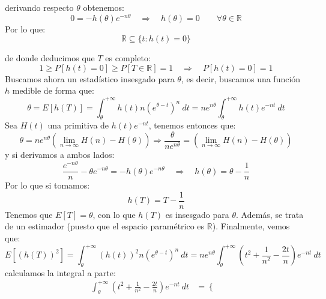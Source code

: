 \begin{ejercicio}
    derivando respecto $\theta$ obtenemos:
    \begin{equation*}
        0 = -h(\theta)e^{-n\theta} \quad \Longrightarrow \quad  h(\theta) = 0 \qquad \forall \theta\in \mathbb{R}
    \end{equation*}
    Por lo que:
    \begin{equation*}
        \mathbb{R}\subseteq \{t:h(t) = 0\}
    \end{equation*}

    de donde deducimos que $T$ es completo:
    \begin{equation*}
        1 \geq P[h(t) = 0] \geq P[T\in \mathbb{R}] = 1 \quad \Longrightarrow \quad P[h(t)=0] = 1
    \end{equation*}
    Buscamos ahora un estadístico insesgado para $\theta$, es decir, buscamos una función $h$ medible de forma que:
    \begin{equation*}
        \theta = E[h(T)] = \int_{\theta}^{+\infty} h(t) n{(e^{\theta-t})}^{n}~dt  = ne^{n\theta}\int_{\theta}^{+\infty} h(t)e^{-nt}~dt 
    \end{equation*}
    Sea $H(t)$ una primitiva de $h(t)e^{-nt}$, tenemos entonces que:
    \begin{equation*}
        \theta = ne^{n\theta}\left(\lim_{n\to\infty}H(n)-H(\theta )\right) \Longrightarrow \frac{\theta}{ne^{n\theta}} = \left(\lim_{n\to\infty}H(n)-H(\theta )\right)
    \end{equation*}
    y si derivamos a ambos lados:
    \begin{equation*}
        \dfrac{e^{-n\theta}}{n} - \theta e^{-n\theta} = -h(\theta)e^{-n\theta} \quad \Longrightarrow \quad  h(\theta) = \theta-\frac{1}{n}
    \end{equation*}
    Por lo que si tomamos:
    \begin{equation*}
        h(T) = T - \dfrac{1}{n}
    \end{equation*}
    Tenemos que $E[T] = \theta$, con lo que $h(T)$ es insesgado para $\theta$. Además, se trata de un estimador (puesto que el espacio paramétrico es $\mathbb{R}$). Finalmente, vemos que:
    \begin{equation*}
        E[{(h(T))}^{2}] = \int_{\theta}^{+\infty} {(h(t))}^{2}n{\left(e^{\theta-t}\right)}^{n}~dt  = ne^{n\theta} \int_{\theta}^{+\infty} \left(t^2 + \frac{1}{n^2}-\frac{2t}{n}\right)e^{-nt}~dt  
    \end{equation*}
    calculamos la integral a parte:
    \begin{align*}
        \int_{\theta}^{+\infty} \left(t^2 + \frac{1}{n^2}-\frac{2t}{n}\right)e^{-nt}~dt &= \left\{\begin{array}{ll}

\end{array}
\end{align*}
\end{ejercicio}
